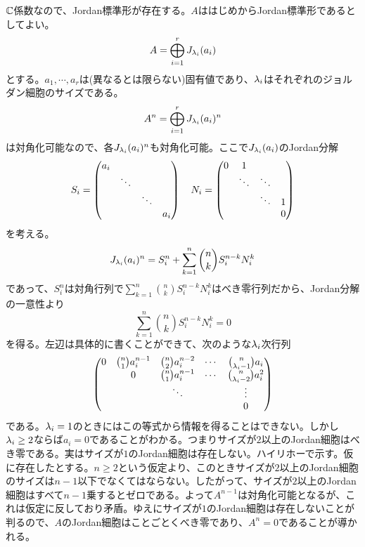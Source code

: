 \subsubsection{} %
\begin{sol}
${\mathbb C}$係数なので、Jordan標準形が存在する。$A$ははじめからJordan標準形であるとしてよい。
\[
A = \bigoplus_{i=1}^r J_{{\lambda}_i}(a_i)
\]
とする。$a_1, \cdots , a_r$は(異なるとは限らない)固有値であり、${\lambda}_i$はそれぞれのジョルダン細胞のサイズである。
\[
A^n = \bigoplus_{i=1}^r J_{{\lambda}_i}(a_i)^n
\]
は対角化可能なので、各$J_{{\lambda}_i}(a_i)^n$も対角化可能。ここで$J_{{\lambda}_i}(a_i)$のJordan分解
\[
S_i = \begin{pmatrix} a_i &  & &  \\  &  \ddots & &  \\ & & \ddots & \\ &  & & a_i \end{pmatrix} \quad N_i = \begin{pmatrix} 0 & 1 & & \\ & \ddots & \ddots & \\ & & \ddots & 1 \\ & & & 0  \end{pmatrix}
\]
を考える。
\[
J_{{\lambda}_i}(a_i)^n = S_i^n + \sum_{k=1}^n \binom{n}{k} S_i^{n-k} N_i^k
\]
であって、$S_i^n$は対角行列で$\sum_{k=1}^n \binom{n}{k} S_i^{n-k} N_i^k$はべき零行列だから、Jordan分解の一意性より
\[
\sum_{k=1}^n \binom{n}{k} S_i^{n-k} N_i^k = 0
\]
を得る。左辺は具体的に書くことができて、次のような${\lambda}_i$次行列
\[
\begin{pmatrix} 
0 & \binom{n}{1} a_i^{n-1} & \binom{n}{2} a_i^{n-2} & \cdots & \binom{n}{{\lambda}_i - 1} a_i \\
  & 0 & \binom{n}{1} a_i^{n-1} & \cdots & \binom{n}{{\lambda}_i - 2} a_i^2 \\
  &   &  \ddots &  & \vdots \\
  &   &        &  &  0
 \end{pmatrix}
\]
である。${\lambda}_i = 1$のときにはこの等式から情報を得ることはできない。しかし${\lambda}_i \geq 2$ならば$a_i = 0$であることがわかる。つまりサイズが$2$以上のJordan細胞はべき零である。実はサイズが$1$のJordan細胞は存在しない。ハイリホーで示す。仮に存在したとする。$n \geq 2$という仮定より、このときサイズが$2$以上のJordan細胞のサイズは$n-1$以下でなくてはならない。したがって、サイズが$2$以上のJordan細胞はすべて$n-1$乗するとゼロである。よって$A^{n-1}$は対角化可能となるが、これは仮定に反しており矛盾。ゆえにサイズが$1$のJordan細胞は存在しないことが判るので、$A$のJordan細胞はことごとくべき零であり、$A^n=0$であることが導かれる。
\end{sol}

\newpage

